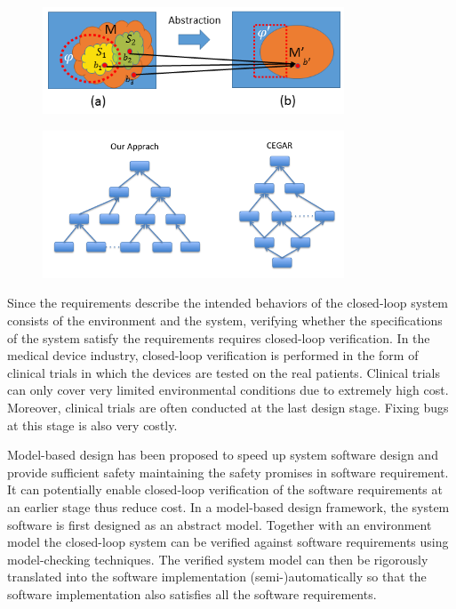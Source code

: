 \documentclass{llncs}
\begin{document}
\begin{figure}[!t]
		\centering
		\includegraphics[width=0.8\textwidth]{figs/distinction.png}
		\caption{\small }
		\label{fig:distinction}
\end{figure}
\begin{figure}[!t]
		\centering
		\includegraphics[width=0.8\textwidth]{figs/env_sys.png}
		\caption{\small }
		\label{fig:distinction}
\end{figure}

Since the requirements describe the intended behaviors of the closed-loop system consists of the environment and the system, verifying whether the specifications of the system satisfy the requirements requires closed-loop verification. In the medical device industry,    closed-loop verification is performed in the form of clinical trials in which the devices are tested on the real patients. Clinical trials can only cover very limited environmental conditions due to extremely high cost. Moreover, clinical trials are often conducted at the last design stage. Fixing bugs at this stage is also very costly.

Model-based design has been proposed to speed up system software design and provide sufficient safety maintaining the safety promises in software requirement. It can potentially enable closed-loop verification of the software requirements at an earlier stage thus reduce cost. In a model-based design framework, the system software is first designed as an abstract model. Together with an environment model the closed-loop system can be verified against software requirements using model-checking techniques. The verified system model can then be rigorously translated into the software implementation (semi-)automatically so that the software implementation also satisfies all the software requirements.
\end{document}
